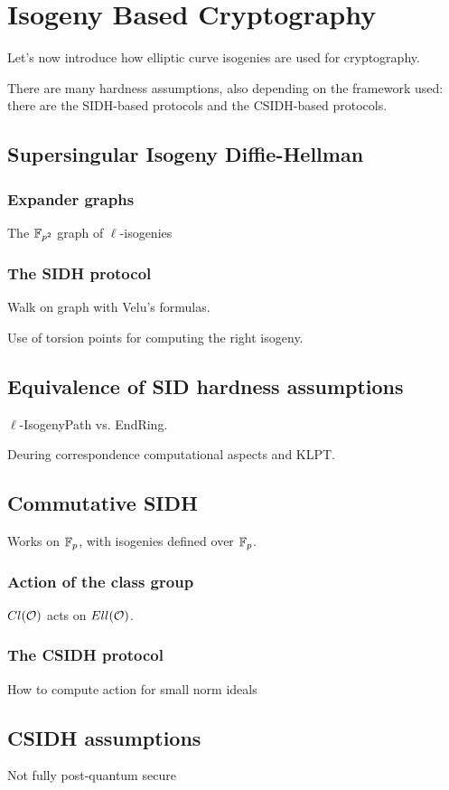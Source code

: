 \chapter{Isogeny Based Cryptography}

Let's now introduce how elliptic curve isogenies are used for cryptography.

There are many hardness assumptions, also depending on the framework used: there are the SIDH-based protocols and the CSIDH-based protocols.

\section{Supersingular Isogeny Diffie-Hellman}
\subsection{Expander graphs}
The $\mathbb{F}_{p^2}$ graph of $\ell$-isogenies

\subsection{The SIDH protocol}
Walk on graph with Velu's formulas.

Use of torsion points for computing the right isogeny.

\section{Equivalence of SID hardness assumptions}
$\ell$-IsogenyPath vs. EndRing.

Deuring correspondence computational aspects and KLPT.

\section{Commutative SIDH}
Works on $\mathbb{F}_p$, with isogenies defined over $\mathbb{F}_p$.

\subsection{Action of the class group}
$Cl(\mathcal{O})$ acts on $Ell(\mathcal{O})$.

\subsection{The CSIDH protocol}
How to compute action for small norm ideals

\section{CSIDH assumptions}
Not fully post-quantum secure

